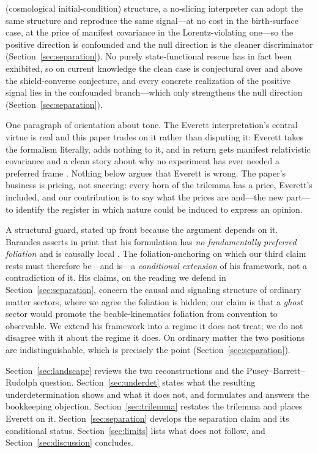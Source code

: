 \documentclass[11pt]{article}
\theoremstyle{remark}
\begin{document}
\begin{enumerate}
(cosmological initial-condition) structure, a no-slicing interpreter
can adopt the same structure and reproduce the same signal---at no cost
in the birth-surface case, at the price of manifest covariance in the
Lorentz-violating one---so the positive direction is confounded and the
null direction is the
cleaner discriminator (Section~\ref{sec:separation}). No purely state-functional
rescue has in fact been exhibited, so on current knowledge the clean
case is conjectural over and above the shield-converse conjecture, and
every concrete realization of the positive signal lies in the
confounded branch---which only strengthens the null direction
(Section~\ref{sec:separation}).
\end{enumerate}

One paragraph of orientation about tone. The Everett interpretation's
central virtue is real and this paper trades on it rather than
disputing it: Everett takes the formalism literally, adds nothing to
it, and in return gets manifest relativistic covariance and a clean
story about why no experiment has ever needed a preferred frame
\cite{Wallace2012}. Nothing below argues that Everett is wrong.
The paper's business is pricing, not sneering: every horn of the
trilemma has a price, Everett's included, and our contribution is to
say what the prices are and---the new part---to identify the register
in which nature could be induced to express an opinion.

A structural guard, stated up front because the argument depends on
it. Barandes asserts in print that his formulation has \emph{no
fundamentally preferred foliation} \cite{BarandesPoP} and is causally
local \cite{BarandesCausal,BHK2025}. The foliation-anchoring on which our
third claim rests must therefore be---and is---a \emph{conditional
extension} of his framework, not a contradiction of it. His claims,
on the reading we defend in Section~\ref{sec:separation}, concern the
causal and signaling structure of ordinary matter sectors,
where we agree the foliation is hidden; our claim is that a
\emph{ghost} sector would promote the beable-kinematics foliation from
convention to observable. We extend his framework into a regime it
does not treat; we do not disagree with it about the regime it does.
On ordinary matter the two positions are indistinguishable, which is
precisely the point (Section~\ref{sec:separation}).

Section~\ref{sec:landscape} reviews the two reconstructions and the
Pusey--Barrett--Rudolph question. Section~\ref{sec:underdet} states
what the resulting underdetermination shows and what it does not, and
formulates and answers the bookkeeping objection.
Section~\ref{sec:trilemma} restates the trilemma and places Everett on
it. Section~\ref{sec:separation} develops the separation claim and its
conditional status. Section~\ref{sec:limits} lists what does not
follow, and Section~\ref{sec:discussion} concludes.
\end{document}
